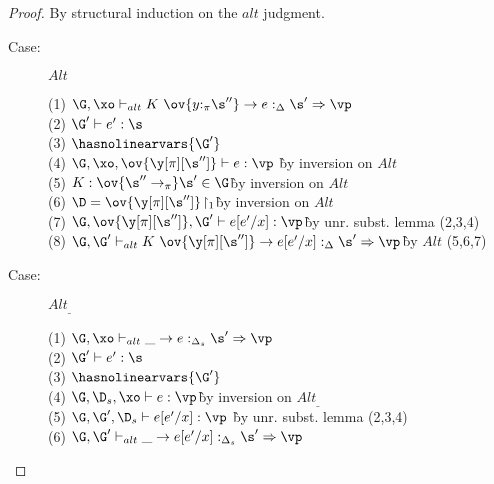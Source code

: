\begin{proof}
By structural induction on the $alt$ judgment.

\begin{description}
\item[Case:] $Alt$
\begin{tabbing}
    (1) $\G, \xo \vdash_{alt} K~\ov{y{:}_\pi\s''} \to e :_\Delta \s' \Rightarrow \vp$\\
    (2) $\G' \vdash e' : \s$\\
    (3) $\hasnolinearvars{\G'}$\\
    (4) $\G, \xo, \ov{\y[\pi][\s'']} \vdash e : \vp$ \` by inversion on $Alt$\\
    (5) $K : \ov{\s'' \to_\pi} \s' \in \G$\` by inversion on $Alt$\\
    (6) $\D = \ov{\y[\pi][\s'']}\!\upharpoonright_1$\` by inversion on $Alt$\\
    (7) $\G,\ov{\y[\pi][\s'']},\G' \vdash e[e'/x] : \vp$\` by unr. subst. lemma (2,3,4)\\
    (8) $\G, \G' \vdash_{alt} K~\ov{\y[\pi][\s'']} \to e[e'/x] :_\Delta \s' \Rightarrow \vp$\` by $Alt$ (5,6,7)\\
\end{tabbing}

\item[Case:] $Alt_\_$
\begin{tabbing}
    (1) $\G, \xo \vdash_{alt} \_ \to e :_{\Delta_s} \s' \Rightarrow \vp$\\
    (2) $\G' \vdash e' : \s$\\
    (3) $\hasnolinearvars{\G'}$\\
    (4) $\G, \D_s, \xo \vdash e : \vp$\` by inversion on $Alt_\_$\\
    (5) $\G, \G', \D_s \vdash e[e'/x] : \vp$ \` by unr. subst. lemma (2,3,4)\\
    (6) $\G ,\G' \vdash_{alt} \_ \to e[e'/x] :_{\Delta_s} \s' \Rightarrow \vp$\\
\end{tabbing}

\end{description}
\end{proof}

